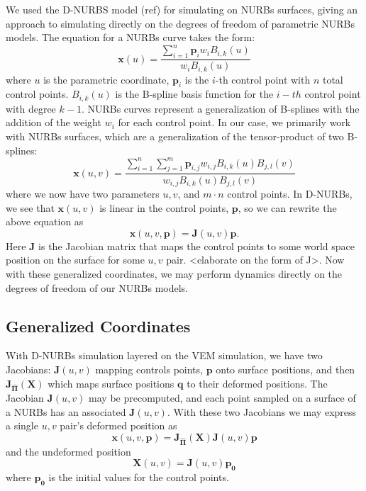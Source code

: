 We used the D-NURBS model (ref) for simulating on NURBs surfaces, giving an approach to simulating directly on the degrees of freedom of parametric NURBs models. The equation for a NURBs curve takes the form:
\begin{equation}
    \mathbf{x}(u) = \frac{\sum_{i=1}^{n} \mathbf{p}_i w_i B_{i,k}(u)}{ w_i B_{i,k}(u)}
\end{equation}
where $u$ is the parametric coordinate, $\mathbf{p}_i$ is the $i$-th control point with $n$ total control points. $B_{i,k}(u)$ is the B-spline basis function for the $i-th$ control point with degree $k-1$. NURBs curves represent a generalization of B-splines with the addition of the weight $w_i$ for each control point. In our case, we primarily work with NURBs surfaces, which are a generalization of the tensor-product of two B-splines:
\begin{equation}
    \mathbf{x}(u,v) = \frac{\sum_{i=1}^{n}\sum_{j=1}^{m}  \mathbf{p}_{i,j} w_{i,j} B_{i,k}(u)B_{j,l}(v)}{ w_{i,j} B_{i,k}(u)B_{j,l}(v)}
\end{equation}
where we now have two parameters $u,v$, and $m\cdot n$ control points. In D-NURBs, we see that $\mathbf{x}(u,v)$ is linear in the control points, $\mathbf{p}$, so we can rewrite the above equation as
\begin{equation}
    \mathbf{x}(u,v,\mathbf{p}) = \mathbf{J}(u,v)\mathbf{p}.
\end{equation}
Here $\mathbf{J}$ is the Jacobian matrix that maps the control points to some world space position on the surface for some $u,v$ pair. <elaborate on the form of J>. Now with these generalized coordinates, we may perform dynamics directly on the degrees of freedom of our NURBs models. 

\subsection{Generalized Coordinates}
With D-NURBs simulation layered on the VEM simulation, we have two Jacobians: $\mathbf{J}(u,v)$ mapping controls points, $\mathbf{p}$ onto surface positions, and then $\mathbf{J_{\hat{\Pi}}(X)}$ which maps surface positions $\mathbf{q}$ to their deformed positions. The Jacobian $\mathbf{J}(u,v)$  may be precomputed, and each point sampled on a surface of a NURBs has an associated $\mathbf{J}(u,v)$. With these two Jacobians we may express a single $u,v$ pair's deformed position as
\begin{equation}
    \mathbf{x}(u,v,\mathbf{p}) = \mathbf{J_{\hat{\Pi}}(X)}\mathbf{J}(u,v)\mathbf{p}
\end{equation}
and the undeformed position
\begin{equation}
    \mathbf{X}(u,v) = \mathbf{J}(u,v)\mathbf{p_0}
\end{equation}
where $\mathbf{p_0}$ is the initial values for the control points.

